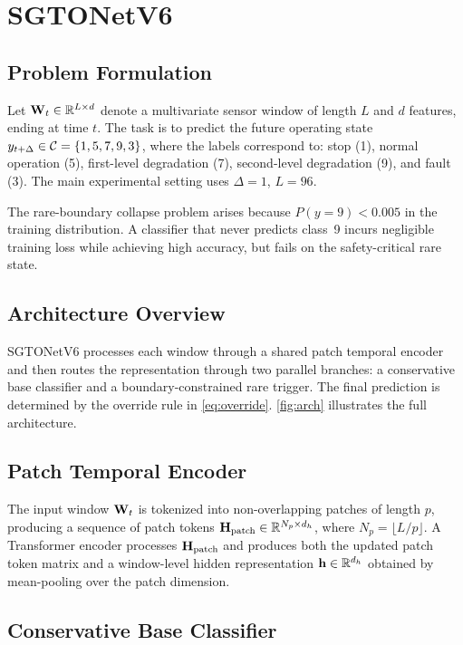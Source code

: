 \section{SGTONetV6}
\label{sec:method}

\subsection{Problem Formulation}

Let $\mathbf{W}_t \in \mathbb{R}^{L \times d}$ denote a multivariate sensor window of length $L$ and $d$ features, ending at time $t$.
The task is to predict the future operating state $y_{t+\Delta} \in \mathcal{C} = \{1, 5, 7, 9, 3\}$, where the labels correspond to: stop (1), normal operation (5), first-level degradation (7), second-level degradation (9), and fault (3).
The main experimental setting uses $\Delta = 1$, $L = 96$.

The rare-boundary collapse problem arises because $P(y = 9) < 0.005$ in the training distribution.
A classifier that never predicts class~9 incurs negligible training loss while achieving high accuracy, but fails on the safety-critical rare state.

\subsection{Architecture Overview}

SGTONetV6 processes each window through a shared patch temporal encoder and then routes the representation through two parallel branches: a conservative base classifier and a boundary-constrained rare trigger.
The final prediction is determined by the override rule in \cref{eq:override}.
\cref{fig:arch} illustrates the full architecture.

\subsection{Patch Temporal Encoder}

The input window $\mathbf{W}_t$ is tokenized into non-overlapping patches of length $p$, producing a sequence of patch tokens $\mathbf{H}_{\mathrm{patch}} \in \mathbb{R}^{N_p \times d_h}$, where $N_p = \lfloor L / p \rfloor$.
A Transformer encoder processes $\mathbf{H}_{\mathrm{patch}}$ and produces both the updated patch token matrix and a window-level hidden representation $\mathbf{h} \in \mathbb{R}^{d_h}$ obtained by mean-pooling over the patch dimension.

\subsection{Conservative Base Classifier}


